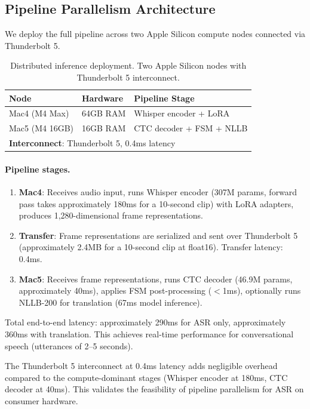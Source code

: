 \documentclass[11pt]{article}
\begin{document}
\subsection{Pipeline Parallelism Architecture}

We deploy the full pipeline across two Apple Silicon compute nodes connected via Thunderbolt 5.

\begin{table}[t]
\centering
\small
\begin{tabular}{lll}
\toprule
\textbf{Node} & \textbf{Hardware} & \textbf{Pipeline Stage} \\
\midrule
Mac4 (M4 Max) & 64GB RAM & Whisper encoder + LoRA \\
Mac5 (M4 16GB) & 16GB RAM & CTC decoder + FSM + NLLB \\
\midrule
\multicolumn{3}{l}{\textbf{Interconnect}: Thunderbolt 5, 0.4ms latency} \\
\bottomrule
\end{tabular}
\caption{Distributed inference deployment. Two Apple Silicon nodes with Thunderbolt 5 interconnect.}
\label{tab:distributed}
\end{table}

\paragraph{Pipeline stages.}
\begin{enumerate}
\item \textbf{Mac4}: Receives audio input, runs Whisper encoder (307M params, forward pass takes approximately 180ms for a 10-second clip) with LoRA adapters, produces 1,280-dimensional frame representations.
\item \textbf{Transfer}: Frame representations are serialized and sent over Thunderbolt 5 (approximately 2.4MB for a 10-second clip at float16). Transfer latency: 0.4ms.
\item \textbf{Mac5}: Receives frame representations, runs CTC decoder (46.9M params, approximately 40ms), applies FSM post-processing ($<$1ms), optionally runs NLLB-200 for translation (67ms model inference).
\end{enumerate}

Total end-to-end latency: approximately 290ms for ASR only, approximately 360ms with translation.
This achieves real-time performance for conversational speech (utterances of 2--5 seconds).

The Thunderbolt 5 interconnect at 0.4ms latency adds negligible overhead compared to the compute-dominant stages (Whisper encoder at 180ms, CTC decoder at 40ms).
This validates the feasibility of pipeline parallelism for ASR on consumer hardware.
\end{document}
